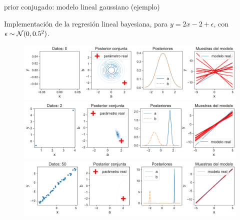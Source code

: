 \documentclass[9pt]{beamer}
\begin{document}
\begin{frame}{prior conjugado: modelo lineal gaussiano (ejemplo)}

Implementación de la regresión lineal bayesiana, para $y = 2x-2	+ \epsilon$, con $\epsilon\sim{\mathcal N}(0,0.5^2)$. 
	
	\begin{figure}[H]
	\includegraphics[height=0.25\textheight,frame]{../img/cap2_bayesian_lin_reg_0.pdf}\\
	\includegraphics[height=0.25\textheight,frame]{../img/cap2_bayesian_lin_reg_2.pdf}\\
	\includegraphics[height=0.25\textheight,frame]{../img/cap2_bayesian_lin_reg_50.pdf}
\end{figure}

\end{frame}
\end{document}
